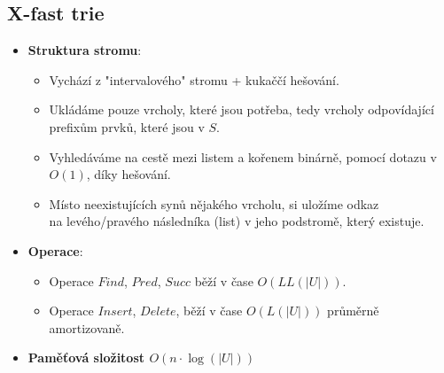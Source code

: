 \documentclass[11pt,a4paper]{article}
\begin{document}
\subsection{X-fast trie}
    \begin{itemize}
        \item \textbf{Struktura stromu}:
        \begin{itemize}
            \item Vychází z "intervalového" stromu + kukaččí hešování.
            \item Ukládáme pouze vrcholy, které jsou potřeba, tedy vrcholy odpovídající prefixům prvků, které jsou v $S$.
            \item Vyhledáváme na cestě mezi listem a kořenem binárně, pomocí dotazu v $O(1)$, díky hešování.
            \item Místo neexistujících synů nějakého vrcholu, si uložíme odkaz \\ na levého/pravého následníka (list) v jeho podstromě, který existuje. 
        \end{itemize}
        \item \textbf{Operace}:
        \begin{itemize}
            \item Operace $Find$, $Pred$, $Succ$ běží v čase $O(LL(|U|))$.
            \item Operace $Insert$, $Delete$, běží v čase $O(L(|U|))$ průměrně amortizovaně.
        \end{itemize}
        \item \textbf{Paměťová složitost $O(n \cdot \log(|U|))$}
    \end{itemize}
\end{document}
